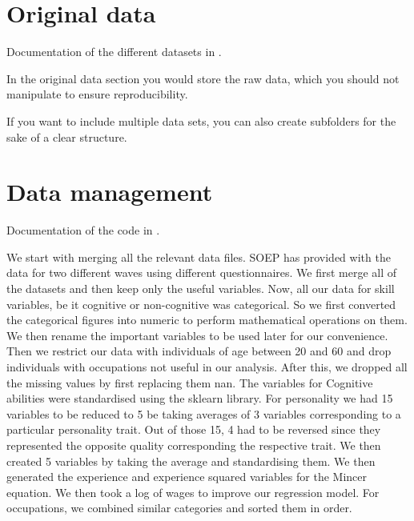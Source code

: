 \documentclass[a4paper,11pt,english]{sphinxmanual}
\begin{document}
\chapter{Original data}
\label{\detokenize{original_data:original-data}}\label{\detokenize{original_data:id1}}\label{\detokenize{original_data::doc}}
Documentation of the different datasets in .

In the original data section you would store the raw data, which you should not manipulate to ensure reproducibility.

If you want to include multiple data sets, you can also create subfolders for the sake of a clear structure.


\chapter{Data management}
\label{\detokenize{data_management:data-management}}\label{\detokenize{data_management:id1}}\label{\detokenize{data_management::doc}}
Documentation of the code in .

\label{\detokenize{data_management:module-src.data_management.get_skill_data}}
We start with merging all the relevant data files. SOEP has provided with the data for two different waves using different questionnaires. We first merge all of the datasets and then keep only the useful variables.
Now, all our data for skill variables, be it cognitive or non-cognitive was categorical. So we first converted the categorical figures into numeric to perform mathematical operations on them. We then rename the important variables to be used later for our convenience.
Then we restrict our data with individuals of age between 20 and 60 and drop individuals with occupations not useful in our analysis. After this, we dropped all the missing values by first replacing them nan.
The variables for Cognitive abilities were standardised using the sklearn library.
For personality we had 15 variables to be reduced to 5 be taking averages of 3 variables corresponding to a particular personality trait. Out of those 15, 4 had to be reversed since they represented the opposite quality corresponding the respective trait. We then created 5 variables by taking the average and standardising them.
We then generated the experience and experience squared variables for the Mincer equation.
We then took a log of wages to improve our regression model.
For occupations, we combined similar categories and sorted them in order.
\end{document}
